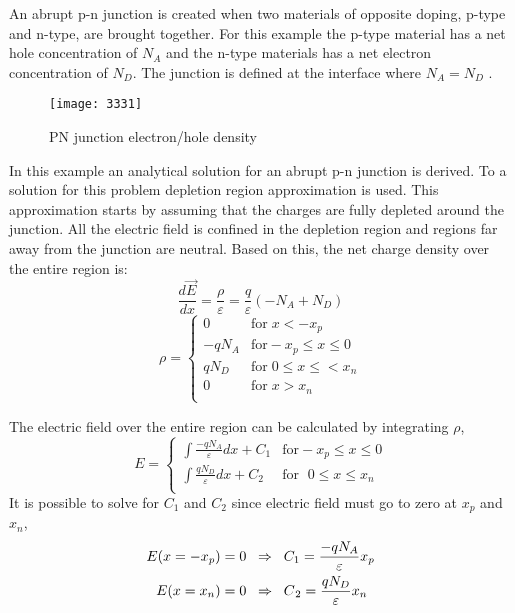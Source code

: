 \begin{doublespace}
An abrupt p-n junction is created when two materials of opposite doping, p-type and n-type, are brought together. For this example the p-type material has a net hole concentration of $N_{A}$ and the n-type materials has a net electron concentration of $N_{D}$. The junction is defined at the interface where $N_A=N_D$ \cite{Physem}. 

\begin{figure}[!htp]
\centering
\texttt{[image: 3331]}
\caption{PN junction electron/hole density} 
\end{figure}

In this example an analytical solution for an abrupt p-n junction is derived. To  a solution for this problem   depletion region approximation is used. This approximation starts by assuming that the charges are fully depleted around the junction\cite{Physem}. All the electric field is confined in the depletion region and regions far away from the junction are neutral. Based on this, the net charge density over the entire region is:
\begin{equation}
\frac{d \vec{E} }{dx}=\frac{\rho}{\varepsilon}=\frac{q}{\varepsilon}(-N_{A}+N_{D})
\end{equation}
\begin{equation}
\rho = \begin{cases}
         0 & \text{for} \;  x<-x_{p}\\
       -qN_{A} & \text{for}  -x_{p}\leq x \leq 0 \\
        qN_{D} & \text{for} \; 0 \leq x \leq< x_{n}  \\
        0 & \text{for}\;  x>x_{n} \\
     \end{cases}
\end{equation}

The electric field over the entire region can be calculated by integrating $\rho$,
\begin{equation}
E = \begin{cases}
       \int \frac{-qN_{A}}{\varepsilon}  dx+ C_{1} & \text{for}  -x_{p}\leq x \leq 0 \\
       \int \frac{qN_{D}}{\varepsilon} dx+ C_{2}   & \text{for } \; 0 \leq x \leq x_{n}  \\
     \end{cases}
\end{equation}
It is possible to solve for $C_{1}$ and $C_{2}$ since electric field must go to zero at $x_{p}$ and $x_{n}$,
\begin{eqnarray}
E(x=-x_{p}) & = 0  \; \;  \Rightarrow  \;\; C_{1}= \frac{-qN_{A}}{\varepsilon}x_{p}\nonumber \\
E(x=x_{n}) & =0  \; \;  \Rightarrow  \;\; C_{\tjsr{}{2}}= \frac{qN_{D}}{\varepsilon}x_{n}
\end{eqnarray}


\end{doublespace}
